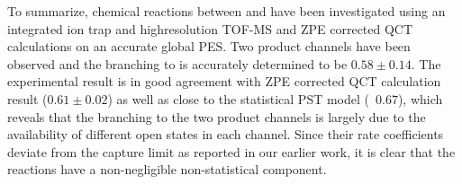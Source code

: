To summarize, chemical reactions between  and  have been investigated using an integrated ion trap and highresolution TOF-MS and ZPE corrected QCT calculations on an accurate global PES. Two product channels have been observed and the branching to  is accurately determined to be $0.58 \pm 0.14$. The experimental result is in good agreement with ZPE corrected QCT calculation result ($0.61 \pm 0.02$) as well as close to the statistical PST model (~0.67), which reveals that the branching to the two product channels is largely due to the availability of different open states in each channel. Since their rate coefficients deviate from the capture limit as reported in our earlier work, it is clear that the  reactions have a non-negligible non-statistical component.